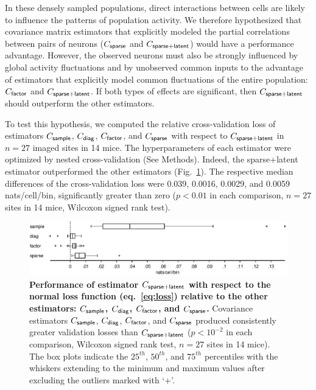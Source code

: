 \documentclass[10pt]{article}
\begin{document}
In these densely sampled populations, direct interactions between cells are likely to influence the patterns of population activity.  We therefore hypothesized that covariance matrix estimators that explicitly modeled the partial correlations between pairs of neurons ($C_{\sf sparse}$ and $C_{\sf sparse+latent}$) would have a performance advantage.  However, the observed neurons must also be strongly influenced by global activity fluctuations and by unobserved common inputs to the advantage of estimators that explicitly model common fluctuations of the entire population: $C_{\sf factor}$ and $C_{\sf sparse+latent}$.  If both types of effects are significant, then $C_{\sf sparse+latent}$ should outperform the other estimators.

To test this hypothesis, we computed the relative cross-validation loss of estimators  $C_{\sf sample}$, $C_{\sf diag}$, $C_{\sf factor}$, and $C_{\sf sparse}$ with respect to $C_{\sf sparse+latent}$ in $n=27$ imaged sites in 14 mice.  The hyperparameters of each estimator were optimized by nested cross-validation (See Methods). Indeed, the sparse+latent estimator outperformed the other estimators (Fig.~\ref{fig:3}). The respective median differences of the cross-validation loss were 0.039, 0.0016, 0.0029, and 0.0059 nats/cell/bin, significantly greater than zero ($p<0.01$ in each comparison, $n=27$ sites in 14 mice, Wilcoxon signed rank test).  

\begin{figure}[!ht]
    \begin{center}
    \includegraphics{./figures/src/Fig3.eps}
    \end{center}
    \caption{
   {\bf Performance of estimator $C_{\sf sparse+latent}$ with respect to the normal loss function (eq.~\ref{eq:loss}) relative to the other estimators: $C_{\sf sample}$, $C_{\sf diag}$, $C_{\sf factor}$, and $C_{\sf sparse}$.} 
    Covariance estimators $C_{\sf sample}$, $C_{\sf diag}$, $C_{\sf factor}$, and $C_{\sf sparse}$ produced consistently greater validation losses than $C_{\sf sparse+latent}$ ($p<10^{-2}$ in each comparison, Wilcoxon signed rank test, $n=27$ sites in 14 mice). The box plots indicate the $25^{th}$, $50^{th}$, and $75^{th}$ percentiles with the whiskers extending to the minimum and maximum values after excluding the outliers marked with `+'. 
} \label{fig:3}
\end{figure}
\end{document}
